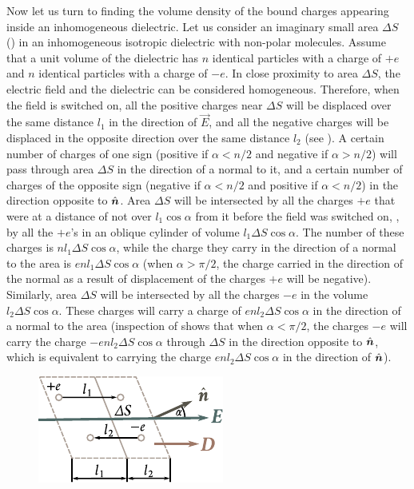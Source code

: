 Now let us turn to finding the volume density of the bound charges appearing inside an inhomogeneous dielectric. Let us consider an imaginary small area $\Delta{S}$ () in an inhomogeneous isotropic dielectric with non-polar molecules.
Assume that a unit volume of the dielectric has $n$ identical particles with a charge of $+e$ and $n$ identical particles with a charge of $-e$. In close proximity to area $\Delta{S}$, the electric field and the dielectric can be considered homogeneous.
Therefore, when the field is switched on, all the positive charges near $\Delta{S}$ will be displaced over the same distance $l_1$ in the direction of $\vec{E}$, and all the negative charges will be displaced in the opposite direction over the same distance $l_2$ (see ).
A certain number of charges of one sign (positive if $\alpha<n/2$ and negative if $\alpha>n/2$) will pass through area $\Delta{S}$ in the direction of a normal to it, and a certain number of charges of the opposite sign (negative if $\alpha<n/2$ and positive if $\alpha<n/2$) in the direction opposite to $\hat{\boldsymbol{n}}$.
Area $\Delta{S}$ will be intersected by all the charges $+e$ that were at a distance of not over $l_1\cos\alpha$ from it before the field was switched on, \ie, by all the $+e$'s in an oblique cylinder of volume $l_1\Delta{S}\cos\alpha$. The number of these charges is $nl_1\Delta{S}\cos\alpha$, while the charge they carry in the direction of a normal to the area is $enl_1\Delta{S}\cos\alpha$ (when $\alpha>\pi/2$, the charge carried in the direction of the normal as a result of displacement of the charges $+e$ will be negative).
Similarly, area $\Delta{S}$ will be intersected by all the charges $-e$ in the volume $l_2\Delta{S}\cos\alpha$. These charges will carry a charge of $enl_2\Delta{S}\cos\alpha$ in the direction of a normal to the area (inspection of  shows that when $\alpha<\pi/2$, the charges $-e$ will carry the charge $-enl_2\Delta{S}\cos\alpha$ through $\Delta{S}$ in the direction opposite to $\hat{\boldsymbol{n}}$, which is equivalent to carrying the charge $enl_2\Delta{S}\cos\alpha$ in the direction of $\hat{\boldsymbol{n}}$).

\begin{figure}[t]
	\begin{center}
		\includegraphics[scale=1]{figures/ch_02/fig_2_3.pdf}
		\caption[]{}
		\label{fig:2_3}
	\end{center}
	\vspace{-0.8cm}
\end{figure}


